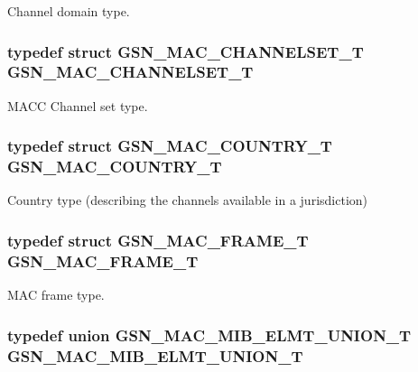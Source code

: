 Channel domain type. 

\hypertarget{a00642_gacacca7fcdec7f267751d787618578af1}{
\subsubsection[{GSN\_\-MAC\_\-CHANNELSET\_\-T}]{\setlength{\rightskip}{0pt plus 5cm}typedef struct {\bf GSN\_\-MAC\_\-CHANNELSET\_\-T}  {\bf GSN\_\-MAC\_\-CHANNELSET\_\-T}}}
\label{a00642_gacacca7fcdec7f267751d787618578af1}


MACC Channel set type. 

\hypertarget{a00642_gaa312c43eca44aa7bb2ab45da931da79f}{
\subsubsection[{GSN\_\-MAC\_\-COUNTRY\_\-T}]{\setlength{\rightskip}{0pt plus 5cm}typedef struct {\bf GSN\_\-MAC\_\-COUNTRY\_\-T}  {\bf GSN\_\-MAC\_\-COUNTRY\_\-T}}}
\label{a00642_gaa312c43eca44aa7bb2ab45da931da79f}


Country type (describing the channels available in a jurisdiction) 

\hypertarget{a00642_gabe8a532741138f69c4e27fc2bb44af8c}{
\subsubsection[{GSN\_\-MAC\_\-FRAME\_\-T}]{\setlength{\rightskip}{0pt plus 5cm}typedef struct {\bf GSN\_\-MAC\_\-FRAME\_\-T}  {\bf GSN\_\-MAC\_\-FRAME\_\-T}}}
\label{a00642_gabe8a532741138f69c4e27fc2bb44af8c}


MAC frame type. 

\hypertarget{a00642_ga64f7d136e7c2a14b7ea884d6ffd901c0}{
\subsubsection[{GSN\_\-MAC\_\-MIB\_\-ELMT\_\-UNION\_\-T}]{\setlength{\rightskip}{0pt plus 5cm}typedef union {\bf GSN\_\-MAC\_\-MIB\_\-ELMT\_\-UNION\_\-T}  {\bf GSN\_\-MAC\_\-MIB\_\-ELMT\_\-UNION\_\-T}}}
\label{a00642_ga64f7d136e7c2a14b7ea884d6ffd901c0}


